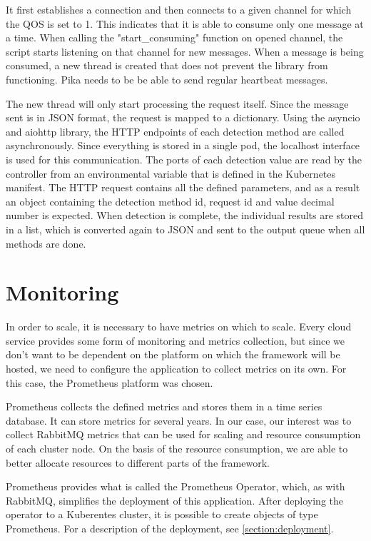 It first establishes a connection and then connects to a given channel for which the QOS is set to 1. This indicates that it is able to consume only one message at a time. When calling the "start\_consuming" function on opened channel, the script starts listening on that channel for new messages. When a message is being consumed, a new thread is created that does not prevent the library from functioning. Pika needs to be be able to send regular heartbeat messages.

The new thread will only start processing the request itself. Since the message sent is in JSON format, the request is mapped to a dictionary. Using the asyncio and aiohttp library, the HTTP endpoints of each detection method are called asynchronously. Since everything is stored in a single pod, the localhost interface is used for this communication. The ports of each detection value are read by the controller from an environmental variable that is defined in the Kubernetes manifest. The HTTP request contains all the defined parameters, and as a result an object containing the detection method id, request id and value decimal number is expected. When detection is complete, the individual results are stored in a list, which is converted again to JSON and sent to the output queue when all methods are done.

\section{Monitoring}
In order to scale, it is necessary to have metrics on which to scale. Every cloud service provides some form of monitoring and metrics collection, but since we don't want to be dependent on the platform on which the framework will be hosted, we need to configure the application to collect metrics on its own. For this case, the Prometheus platform was chosen.

Prometheus collects the defined metrics and stores them in a time series database. It can store metrics for several years. In our case, our interest was to collect RabbitMQ metrics that can be used for scaling and resource consumption of each cluster node. On the basis of the resource consumption, we are able to better allocate resources to different parts of the framework. 

Prometheus provides what is called the Prometheus Operator, which, as with RabbitMQ, simplifies the deployment of this application. After deploying the operator to a Kuberentes cluster, it is possible to create objects of type Prometheus. For a description of the deployment, see \ref{section:deployment}.

